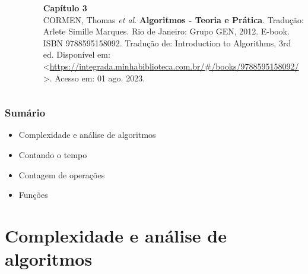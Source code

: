 \documentclass[aspectratio=169]{beamer}
\begin{document}
\begin{frame}
\begin{columns}[T]
\begin{column}{0.15\linewidth}
\vspace{-3mm}
\begin{figure}[h]
	\centering
	\includegraphics[height=0.3\paperheight]{pucrs-ec-poo-unidade_01-complexidade_de_algoritmos-laminas-livro_cormen.jpg}
\end{figure}
\end{column}
\begin{column}{0.85\linewidth}
\vspace{3mm}
\textbf{Capítulo 3}\\
\scriptsize{CORMEN, Thomas \emph{et al}. \textbf{Algoritmos - Teoria e Prática}. Tradução: Arlete Simille Marques. Rio de Janeiro: Grupo GEN, 2012. E-book. ISBN 9788595158092. Tradução de: Introduction to Algorithms, 3rd ed. Disponível em: \textless{}\url{https://integrada.minhabiblioteca.com.br/\#/books/9788595158092/}\textgreater{}. Acesso em: 01 ago. 2023.}
\end{column}
\end{columns}

\end{frame}

\begin{frame}\frametitle{Sumário}
\begin{itemize}
	\item Complexidade e análise de algoritmos
	\item Contando o tempo
	\item Contagem de operações
	\item Funções
\end{itemize}
\end{frame}

\section{Complexidade e análise de algoritmos}
\end{document}
